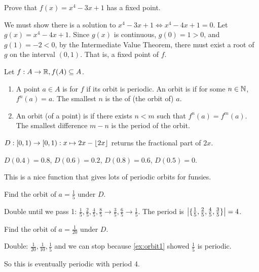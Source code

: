 \documentclass[class=pmath370,tikz,notes]{agony}
\begin{document}
\begin{example}
  Prove that $f(x) = x^4 - 3x + 1$ has a fixed point.
\end{example}
\begin{prf}
  We must show there is a solution to $x^4 - 3x + 1 \iff x^4 - 4x + 1 = 0$.
  Let $g(x) = x^4 - 4x + 1$.
  Since $g(x)$ is continuous, $g(0) = 1 > 0$, and $g(1) = -2 < 0$,
  by the Intermediate Value Theorem, there must exist a root of $g$ on the interval $(0,1)$.
  That is, a fixed point of $f$.
\end{prf}

\begin{defn}[periodicity]
  Let $f : A \to \mathbb{R}, f(A) \subseteq A$.
  \begin{enumerate}[nosep]
    \item A point $a \in A$ is  for $f$ if its orbit is periodic.
          An orbit is  if for some $n \in \mathbb{N}$, $f^n(a) = a$.
          The smallest $n$ is the  of (the orbit of) $a$.
    \item An orbit (of a point) is 
          if there exists $n < m$ such that $f^n(a) = f^m(a)$.
          The smallest difference $m-n$ is the period of the orbit.
  \end{enumerate}
\end{defn}

\begin{defn}
  $D : [0,1) \to [0,1) : x \mapsto 2x-\lfloor2x\rfloor$
  returns the fractional part of $2x$.
\end{defn}
\begin{example}
  $D(0.4) = 0.8$, $D(0.6) = 0.2$, $D(0.8) = 0.6$, $D(0.5) = 0$.
\end{example}

This is a nice function that gives lots of periodic orbits for funsies.

\begin{example}\label{ex:orbit1}
  Find the orbit of $a=\frac15$ under $D$.
\end{example}
\begin{sol}
  Double until we pass 1: $\frac15, \frac25, \frac45, \frac85 \to \frac35, \frac65 \to \frac15$.
  The period is $\abs{\{\frac15,\frac25,\frac45,\frac35\}} = 4$.
\end{sol}

\begin{example}
  Find the orbit of $a=\frac1{20}$ under $D$.
\end{example}
\begin{sol}
  Double: $\frac1{20}, \frac1{10}, \frac15$ and we can stop
  because \cref{ex:orbit1} showed $\frac15$ is periodic.

  So this is eventually periodic with period 4.
\end{sol}
\end{document}
